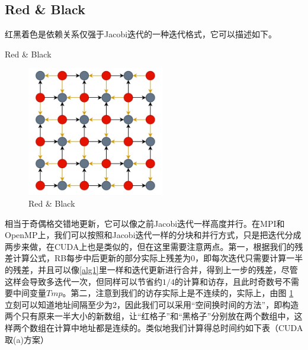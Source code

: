 \documentclass{article}
\begin{document}
\subsection{Red \& Black}
红黑着色是依赖关系仅强于Jacobi迭代的一种迭代格式，它可以描述如下。
\begin{algorithm}[H]
	\caption{Red \& Black}
	\begin{algorithmic}[1]
		\ENDIF 
		\ENDIF
		\ENDWHILE
	\end{algorithmic}
\end{algorithm}
\begin{figure}[H]

\centering
\includegraphics[width=6cm]{./fig/rb}
\caption{Red \& Black\label{fig:rb}}
\end{figure}
相当于奇偶格交错地更新，它可以像之前Jacobi迭代一样高度并行。在MPI和OpenMP上，我们可以按照和Jacobi迭代一样的分块和并行方式，只是把迭代分成两步来做，在CUDA上也是类似的，但在这里需要注意两点。第一，根据我们的残差计算公式，RB每步中后更新的部分实际上残差为0，即每次迭代只需要计算一半的残差，并且可以像\eqref{alg1}里一样和迭代更新进行合并，得到上一步的残差，尽管这样会导致多迭代一次，但同样可以节省约$1/4$的计算和访存，且此时奇数号不需要中间变量$Tmp$。第二，注意到我们的访存实际上是不连续的，实际上，由图 \ref{fig:rb} 立刻可以知道地址间隔至少为2，因此我们可以采用“空间换时间的方法”，即构造两个只有原来一半大小的新数组，让“红格子”和“黑格子”分别放在两个数组中，这样两个数组在计算中地址都是连续的。类似地我们计算得总时间约如下表（CUDA取(a)方案）
\end{document}

